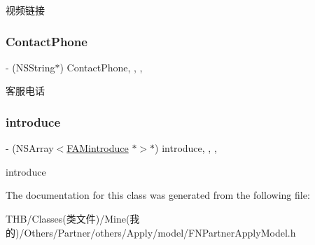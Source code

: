 视频链接 \mbox{\label{interface_f_n_partner_apply_model_a76f8242b0cca34b0b28f8ad669cb4487}} 
\subsubsection{\texorpdfstring{Contact\+Phone}{ContactPhone}}
{\footnotesize\ttfamily -\/ (N\+S\+String$\ast$) Contact\+Phone\hspace{0.3cm}{\ttfamily [read]}, {\ttfamily [write]}, {\ttfamily [nonatomic]}, {\ttfamily [copy]}}

客服电话 \mbox{\label{interface_f_n_partner_apply_model_a0cc8d0216a8f3d231e33f25157ca0e82}} 
\subsubsection{\texorpdfstring{introduce}{introduce}}
{\footnotesize\ttfamily -\/ (N\+S\+Array$<$\mbox{\hyperlink{interface_f_a_mintroduce}{F\+A\+Mintroduce}} $\ast$$>$$\ast$) introduce\hspace{0.3cm}{\ttfamily [read]}, {\ttfamily [write]}, {\ttfamily [nonatomic]}, {\ttfamily [strong]}}

introduce 

The documentation for this class was generated from the following file\+:\begin{DoxyCompactItemize}
\item 
T\+H\+B/\+Classes(类文件)/\+Mine(我的)/\+Others/\+Partner/others/\+Apply/model/F\+N\+Partner\+Apply\+Model.\+h\end{DoxyCompactItemize}
